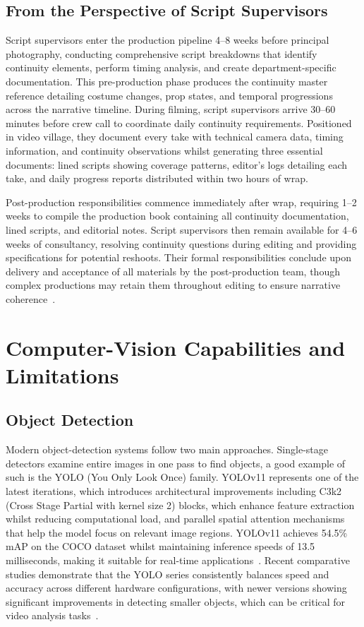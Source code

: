 \subsection{From the Perspective of Script Supervisors}

Script supervisors enter the production pipeline 4–8 weeks before principal photography, conducting comprehensive script breakdowns that identify continuity elements, perform timing analysis, and create department-specific documentation. This pre-production phase produces the continuity master reference detailing costume changes, prop states, and temporal progressions across the narrative timeline. During filming, script supervisors arrive 30–60 minutes before crew call to coordinate daily continuity requirements. Positioned in video village, they document every take with technical camera data, timing information, and continuity observations whilst generating three essential documents: lined scripts showing coverage patterns, editor's logs detailing each take, and daily progress reports distributed within two hours of wrap.

Post-production responsibilities commence immediately after wrap, requiring 1–2 weeks to compile the production book containing all continuity documentation, lined scripts, and editorial notes. Script supervisors then remain available for 4–6 weeks of consultancy, resolving continuity questions during editing and providing specifications for potential reshoots. Their formal responsibilities conclude upon delivery and acceptance of all materials by the post-production team, though complex productions may retain them throughout editing to ensure narrative coherence~\cite{wickens2015,kreativalchemy2024}.

\section{Computer-Vision Capabilities and Limitations}

\subsection{Object Detection}

Modern object-detection systems follow two main approaches. Single-stage detectors examine entire images in one pass to find objects, a good example of such is the YOLO (You Only Look Once) family. YOLOv11 represents one of the latest iterations, which introduces architectural improvements including C3k2 (Cross Stage Partial with kernel size 2) blocks, which enhance feature extraction whilst reducing computational load, and parallel spatial attention mechanisms that help the model focus on relevant image regions. YOLOv11 achieves 54.5\% mAP on the COCO dataset whilst maintaining inference speeds of 13.5 milliseconds, making it suitable for real-time applications~\cite{ultralytics2024}. Recent comparative studies demonstrate that the YOLO series consistently balances speed and accuracy across different hardware configurations, with newer versions showing significant improvements in detecting smaller objects, which can be critical for video analysis tasks~\cite{khanam2024}.

